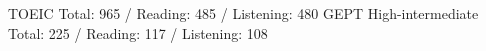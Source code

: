 



\begin{cvskills}

      \cvskill
        {TOEIC} %
        {Total: 965 / Reading: 485 / Listening: 480} %
      \cvskill
        {GEPT High-intermediate} %
        {Total: 225 / Reading: 117 / Listening: 108} %
    
    
    
\end{cvskills}